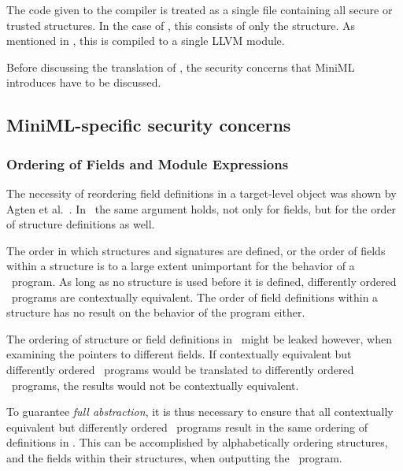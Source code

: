 The code given to the compiler is treated as a single file containing all secure or trusted structures.
In the case of , this consists of only the  structure.
As mentioned in , this is compiled to a single LLVM module.

Before discussing the translation of , the security concerns that MiniML introduces have to be discussed.

\subsection{MiniML-specific security concerns}

\subsubsection{Ordering of Fields and Module Expressions}
The necessity of reordering field definitions in a target-level object was shown by Agten et al.~\cite{Agten:2012:SCM:2354412.2355247}.
In \MiniML\ the same argument holds, not only for fields, but for the order of structure definitions as well.

The order in which structures and signatures are defined, or the order of fields within a structure is to a large extent unimportant for the behavior of a \MiniML\ program.
As long as no structure is used before it is defined, differently ordered \MiniML\ programs are contextually equivalent.
The order of field definitions within a structure has no result on the behavior of the program either.

The ordering of structure or field definitions in \LLVMIR\ might be leaked however, when examining the pointers to different fields.
If contextually equivalent but differently ordered \MiniML\ programs would be translated to differently ordered \LLVMIR\ programs, the results would not be contextually equivalent.

To guarantee \emph{full abstraction}, it is thus necessary to ensure that all contextually equivalent but differently ordered \MiniML\ programs result in the same ordering of definitions in \LLVMIR.
This can be accomplished by alphabetically ordering structures, and the fields within their structures, when outputting the \LLVMIR\ program.

